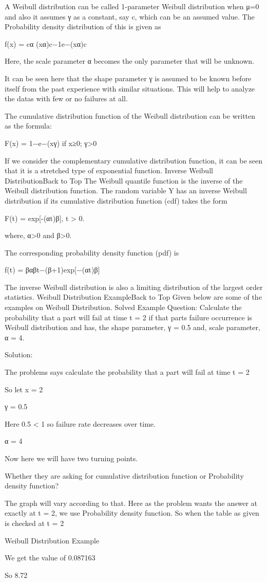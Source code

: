 \documentclass{beamer}
\begin{document}
	A Weibull distribution can be called 1-parameter Weibull distribution when μ=0 and also it assumes γ as a constant, say c, which can be an assumed value. The Probability density distribution of this is given as
	
	f(x) = cα (xα)c−1e−(xα)c
	
	Here, the scale parameter α becomes the only parameter that will be unknown.
	
	It can be seen here that the shape parameter γ is assumed to be known before itself from the past experience with similar situations. This will help to analyze the datas with few or no failures at all.
	
	The cumulative distribution function of the Weibull distribution can be written as the formula:
	
	F(x) = 1−e−(xγ) if x≥0; γ>0 
	
	If we consider the complementary cumulative distribution function, it can be seen that it is a stretched type of exponential function.
	Inverse Weibull DistributionBack to Top
	The Weibull quantile function is the inverse of the Weibull distribution function. The random variable Y has an inverse Weibull distribution if its cumulative distribution function (cdf) takes the form
	
	F(t) = exp[-(αt)β], t > 0.
	
	where, α>0 and β>0.
	
	The corresponding probability density function (pdf) is
	
	f(t) = βαβt−(β+1)exp[−(αt)β]
	
	The inverse Weibull distribution is also a limiting distribution of the largest order statistics.
	Weibull Distribution ExampleBack to Top
	Given below are some of the examples on Weibull Distribution.
	Solved Example
	Question: Calculate the probability that a part will fail at time t = 2 if that parts failure occurrence is Weibull distribution and has, the shape parameter, γ = 0.5 and, scale parameter, α = 4.
	
	Solution:
	
	The problems says calculate the probability that a part will fail at time t = 2
	
	So let x = 2
	
	γ = 0.5
	
	Here 0.5 < 1 so failure rate decreases over time.
	
	α = 4
	
	Now here we will have two turning points.
	
	Whether they are asking for cumulative distribution function or Probability density function?
	
	The graph will vary according to that. Here as the problem wants the answer at exactly at t = 2, we use Probability density function.
	So when the table as given is checked at t = 2
	
	Weibull Distribution Example
	
	We get the value of 0.087163
	
	So 8.72%
\end{document}
